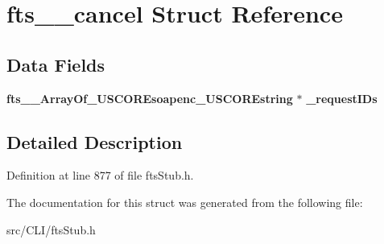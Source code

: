 \section{fts\_\-\_\-cancel Struct Reference}
\label{structfts____cancel}
\subsection*{Data Fields}
\begin{DoxyCompactItemize}
\item 
{\bf fts\_\-\_\-ArrayOf\_\-USCOREsoapenc\_\-USCOREstring} $\ast$ {\bfseries \_\-requestIDs}\label{structfts____cancel_aeb0c8cacbf8bcfd8ba7850fab852da23}

\end{DoxyCompactItemize}


\subsection{Detailed Description}


Definition at line 877 of file ftsStub.h.



The documentation for this struct was generated from the following file:\begin{DoxyCompactItemize}
\item 
src/CLI/ftsStub.h\end{DoxyCompactItemize}
